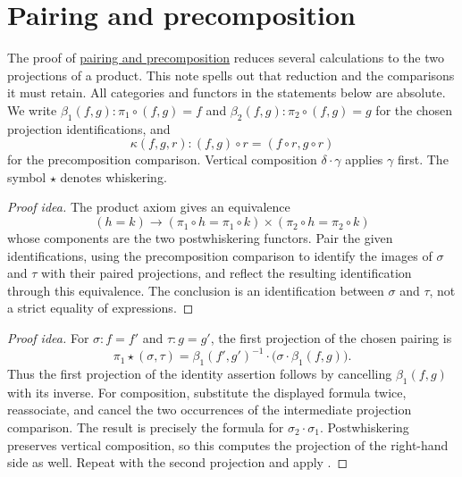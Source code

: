 \documentclass[11pt]{article}
\begin{document}
\section*{Pairing and precomposition}

The proof of \href{equivalences.html\#lem:Finite_Compatibility_Of_Products}{pairing and precomposition}
reduces several calculations to the two projections of a product. This note
spells out that reduction and the comparisons it must retain.
All categories and functors in the statements below are absolute.
We write $\beta_1(f,g)\colon\pi_1\circ(f,g)=f$ and
$\beta_2(f,g)\colon\pi_2\circ(f,g)=g$ for the chosen projection
identifications, and
\[
 \kappa(f,g,r)\colon(f,g)\circ r=(f\circ r,g\circ r)
\]
for the precomposition comparison. Vertical composition $\delta\cdot\gamma$
applies $\gamma$ first. The symbol $\star$ denotes whiskering.

\begin{proof}[Proof idea]
The product axiom gives an equivalence
\[
 (h=k)\longrightarrow
 (\pi_1\circ h=\pi_1\circ k)\times(\pi_2\circ h=\pi_2\circ k)
\]
whose components are the two postwhiskering functors. Pair the given
identifications, using the precomposition comparison to identify the
images of $\sigma$ and $\tau$ with their paired projections, and reflect
the resulting identification through this equivalence. The conclusion is
an identification between $\sigma$ and $\tau$, not a strict equality of
expressions.
\end{proof}

\begin{proof}[Proof idea]
For $\sigma\colon f=f'$ and $\tau\colon g=g'$, the first projection
of the chosen pairing is
\[
 \pi_1\star(\sigma,\tau)
 =\beta_1(f',g')^{-1}\cdot
       \bigl(\sigma\cdot\beta_1(f,g)\bigr).
\]
Thus the first projection of the identity assertion follows by cancelling
$\beta_1(f,g)$ with its inverse. For composition, substitute the displayed
formula twice, reassociate, and cancel the two occurrences of the
intermediate projection comparison. The result is precisely the formula
for $\sigma_2\cdot\sigma_1$. Postwhiskering preserves vertical
composition, so this computes the projection of the right-hand side as
well. Repeat with the second projection and apply
.
\end{proof}
\end{document}
